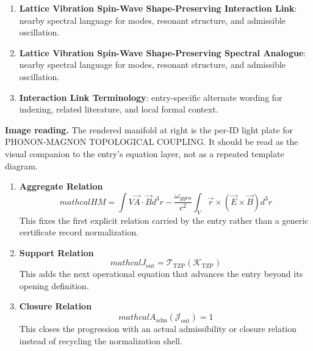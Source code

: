 \begin{enumerate}[leftmargin=1.6em,itemsep=6pt,topsep=4pt]
\item \textbf{Lattice Vibration Spin-Wave Shape-Preserving Interaction Link}: nearby spectral language for modes, resonant structure, and admissible oscillation.
\item \textbf{Lattice Vibration Spin-Wave Shape-Preserving Spectral Analogue}: nearby spectral language for modes, resonant structure, and admissible oscillation.
\item \textbf{Interaction Link Terminology}: entry-specific alternate wording for indexing, related literature, and local formal context.
\end{enumerate}

\begin{samepage}
\noindent\begin{minipage}[t]{0.45\linewidth}
\vspace{0pt}
\raggedright
\scriptsize\textbf{Image reading.} The rendered manifold at right is the per-ID light plate for PHONON-MAGNON TOPOLOGICAL COUPLING. It should be read as the visual companion to the entry's equation layer, not as a repeated template diagram.\par
\end{minipage}\hfill
\begin{minipage}[t]{0.53\linewidth}
\vspace*{-0.10in}
\raggedright
{}
\end{minipage}
\end{samepage}

\clearpage


\begin{enumerate}[leftmargin=1.6em,itemsep=9pt,topsep=6pt]
\item \textbf{Aggregate Relation}
\[
mathcal{H} {M} = \int {V}\vec{A}\cdot\vec{B}d^{3}r - \frac{\omega_{gyro}}{c^{2}}\int_{V}\vec{r}\times(\vec{E}\times\vec{B})d^{3}r
\]
This fixes the first explicit relation carried by the entry rather than a generic certificate record normalization.

\item \textbf{Support Relation}
\[
mathcal{J}_{\mathrm{out}} = \mathcal{T}_{\mathrm{TZP}}\!\left(\mathcal{K}_{\mathrm{TZP}}\right)
\]
This adds the next operational equation that advances the entry beyond its opening definition.

\item \textbf{Closure Relation}
\[
mathcal{A}_{\mathrm{adm}}\!\left(\mathcal{J}_{\mathrm{out}}\right)=1
\]
This closes the progression with an actual admissibility or closure relation instead of recycling the normalization shell.
\end{enumerate}

